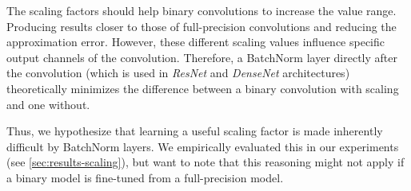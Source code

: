 \documentclass[10pt,twocolumn,letterpaper]{article}
\newcommand{\architecture}[1]{\emph{#1}}
\begin{document}
The scaling factors should help binary convolutions to increase the value range.
Producing results closer to those of full-precision convolutions and reducing the approximation error.
However, these different scaling values influence specific output channels of the convolution.
Therefore, a BatchNorm \cite{ioffe2015batch} layer directly after the convolution (which is used in \architecture{ResNet} and \architecture{DenseNet} architectures) theoretically minimizes the difference between a binary convolution with scaling and one without.

Thus, we hypothesize that learning a useful scaling factor is made inherently difficult by BatchNorm layers.
We empirically evaluated this in our experiments (see \autoref{sec:results-scaling}), but want to note that this reasoning might not apply if a binary model is fine-tuned from a full-precision model. %
\captionsetup[subfigure]{justification=centering}
\end{document}

